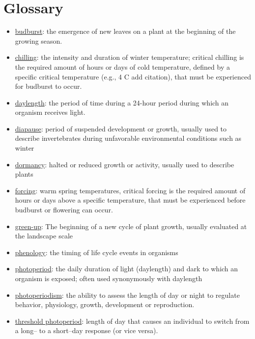 \documentclass{article}
\begin{document}
\section* {Glossary}
\begin{itemize}
\item \underline{budburst}: the emergence of new leaves on a plant at the beginning of the growing season. %
\item \underline{chilling}: the intensity and duration of winter temperature; critical chilling is the required amount of hours or days of cold temperature, defined by a specific critical temperature (e.g., 4 \degree C add citation), that must be experienced for budburst to occur.
\item \underline{daylength}: the period of time during a 24-hour period during which an organism receives light.

\item \underline{diapause}: period of suspended development or growth, usually used to describe invertebrates during unfavorable environmental conditions such as winter
\item \underline{dormancy}: halted or reduced growth or activity, usually used to describe plants
\item \underline{forcing}: warm spring temperatures, critical forcing is the required amount of hours or days above a specific temperature, that must be experienced before budburst or flowering can occur.
\item \underline{green-up}: The beginning of a new cycle of plant growth, usually evaluated at the landscape scale
\item \underline{phenology}: the timing of life cycle events in organisms
\item \underline{photoperiod}: the daily duration of light (daylength) and dark to which an organism is exposed; often used synonymously with daylength
\item \underline{photoperiodism}: the ability to assess the length of day or night to regulate behavior, physiology, growth, development or reproduction.
\item \underline{threshold photoperiod}: length of day that causes an individual to switch from a long-- to a short--day response (or vice versa). %
\end{itemize}
\end{document}
